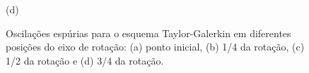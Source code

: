 \begin{figure}[H]
\begin{minipage}{.5\linewidth}
      (d)
     \end{minipage}
     \medskip
     \caption{Oscilações espúrias para o esquema Taylor-Galerkin em diferentes posições do eixo de rotação:
     (a) ponto inicial, 
     (b) 1/4 da rotação,
     (c) 1/2 da rotação e
     (d) 3/4 da rotação.}
     \label{taylor}
\end{figure}

